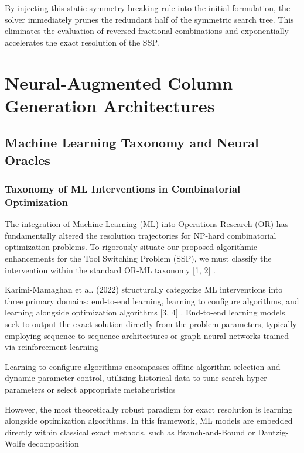 \documentclass[11pt, a4paper]{book}
\begin{document}
	By injecting this static symmetry-breaking rule into the initial formulation, the solver immediately prunes the redundant half of the symmetric search tree. This eliminates the evaluation of reversed fractional combinations and exponentially accelerates the exact resolution of the SSP.
	
	\chapter{Neural-Augmented Column Generation Architectures}
	
	\section{Machine Learning Taxonomy and Neural Oracles}
	
	\subsection{Taxonomy of ML Interventions in Combinatorial Optimization}
	
	The integration of Machine Learning (ML) into Operations Research (OR) has fundamentally altered the resolution trajectories for NP-hard combinatorial optimization problems. To rigorously situate our proposed algorithmic enhancements for the Tool Switching Problem (SSP), we must classify the intervention within the standard OR-ML taxonomy  [1, 2] . 
	
	Karimi-Mamaghan et al. (2022) structurally categorize ML interventions into three primary domains: end-to-end learning, learning to configure algorithms, and learning alongside optimization algorithms  [3, 4] . End-to-end learning models seek to output the exact solution directly from the problem parameters, typically employing sequence-to-sequence architectures or graph neural networks trained via reinforcement learning %
	
	Learning to configure algorithms encompasses offline algorithm selection and dynamic parameter control, utilizing historical data to tune search hyper-parameters or select appropriate metaheuristics %
	
	However, the most theoretically robust paradigm for exact resolution is learning alongside optimization algorithms. In this framework, ML models are embedded directly within classical exact methods, such as Branch-and-Bound or Dantzig-Wolfe decomposition %
	
\end{document}
